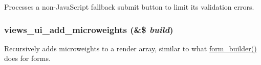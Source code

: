 \label{admin_8inc_a77ce1a8b53feb8ec8c024fa4eb8c18e3}
Processes a non-\/JavaScript fallback submit button to limit its validation errors. \hypertarget{admin_8inc_a21c22d965161a3efb6b1f10570d3f9cd}{
\subsubsection[{views\_\-ui\_\-add\_\-microweights}]{\setlength{\rightskip}{0pt plus 5cm}views\_\-ui\_\-add\_\-microweights (\&\$ {\em build})}}
\label{admin_8inc_a21c22d965161a3efb6b1f10570d3f9cd}
Recursively adds microweights to a render array, similar to what \hyperlink{group__form__api_gae839323ba1c81ba86030b496fee24f7d}{form\_\-builder()} does for forms.

